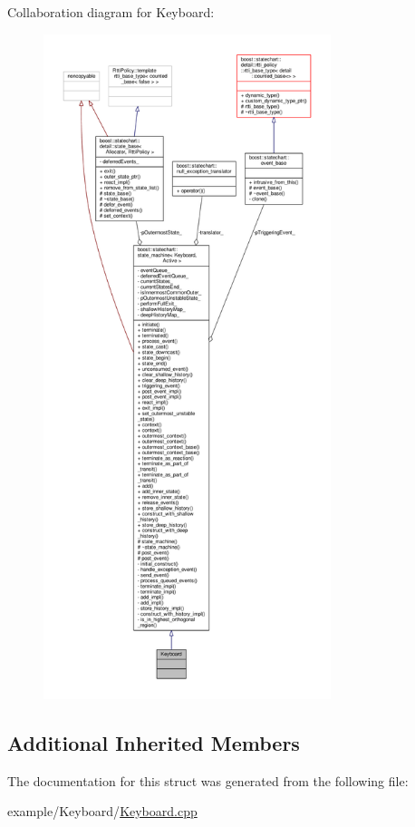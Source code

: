 Collaboration diagram for Keyboard\+:
\nopagebreak
\begin{figure}[H]
\begin{center}
\leavevmode
\includegraphics[height=550pt]{struct_keyboard__coll__graph}
\end{center}
\end{figure}
\subsection*{Additional Inherited Members}


The documentation for this struct was generated from the following file\+:\begin{DoxyCompactItemize}
\item 
example/\+Keyboard/\mbox{\hyperlink{_keyboard_8cpp}{Keyboard.\+cpp}}\end{DoxyCompactItemize}
